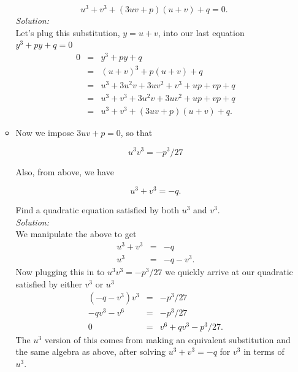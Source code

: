 \documentclass[10pt]{amsart}
\theoremstyle{nonumberplain}
\begin{document}
\begin{enumerate}[label={\bf {\arabic*}:}]
\begin{itemize}
$$
u^3+v^3+(3 u v+p)(u+v)+q=0 \text {. }
$$
\textit{Solution:} \\
Let's plug this substitution, $y=u+v$, into our last equation $y^3+p y+q=0$
\begin{eqnarray*}
0 &=& y^3+p y+q \\
   &=& (u + v)^3 + p(u + v) + q \\
   &=& u^3 + 3u^2v + 3uv^2 + v^3 + up + vp + q \\
   &=& u^3 + v^3 + 3u^2v + 3uv^2 + up + vp + q \\
   &=& u^3 + v^3 + (3uv +  p)(u + v) + q.
\end{eqnarray*}

\item Now we impose $3 u v+p=0$, so that

$$
u^3 v^3=-p^3 / 27
$$

Also, from above, we have

$$
u^3+v^3=-q .
$$

Find a quadratic equation satisfied by both $u^3$ and $v^3$. \\
\textit{Solution:} \\
We manipulate the above to get
\begin{eqnarray*}
u^3+v^3&=&-q \\
u^3&=&-q - v^3.
\end{eqnarray*}
Now plugging this in to $u^3 v^3=-p^3 / 27$ we quickly arrive at our quadratic satisfied by either $v^3$ or $u^3$
\begin{eqnarray*}
\left(-q - v^3\right) v^3 &=& -p^3 / 27 \\
-qv^3 - v^6 &=& -p^3 / 27 \\
0 &=& v^6 + qv^3 - p^3 / 27.
\end{eqnarray*}
The $u^3$ version of this comes from making an equivalent substitution and the same algebra as above, after solving $u^3+v^3=-q$ for $v^3$ in terms of $u^3$.


\end{itemize}
\end{enumerate}
\end{document}

